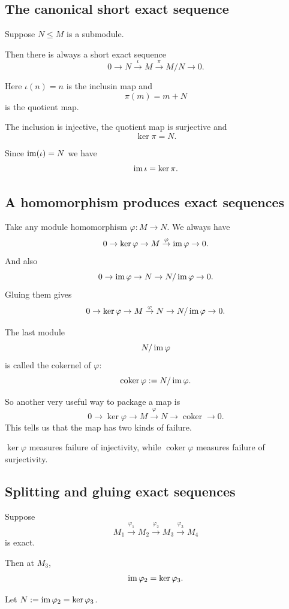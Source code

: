 \documentclass[11pt]{article}
\begin{document}
\subsection{The canonical short exact sequence}

Suppose $N \leq M$ is a submodule. 

Then there is always a short exact sequence 
\[
    0 \to N \overset{\iota}{\to} M 
    \overset{\pi}{\to} M/N \to 0. 
\]

Here $\iota(n) = n$ 
is the inclusin map and 
\[
    \pi(m) = m+N
\]
is the quotient map. 

The inclusion is injective, the quotient map 
is surjective and 
\[
    \ker \pi = N. 
\]

Since $\operatorname{im}(\iota) = N$ we have 
\[
    \operatorname{im} \iota = \ker \pi. 
\]

\subsection{A homomorphism produces 
exact sequences}

Take any module homomorphism $\varphi : M \to N$. 
We always have 
\[
    0 \to \ker \varphi \to M \overset{\varphi}{\to} 
    \operatorname{im} \varphi \to 0. 
\]
And also 
\[
    0 \to \operatorname{im} \varphi \to N \to N/\operatorname{im} \varphi \to 0. 
\]
Gluing them gives 
\[
    0 \to \ker \varphi \to M \overset{\varphi}{\to}
    N \to N/\operatorname{im}\varphi \to 0. 
\]

The last module 
\[
    N/\operatorname{im} \varphi
\]
is called the cokernel of $\varphi$: 
\[
    \operatorname{coker} \varphi := N/\operatorname{im} \varphi. 
\]

So another very useful way to package a map is 
\[
    0 \to \ker \varphi \to 
    M \overset{\varphi}{\to} N \to \operatorname{coker} 
    \to 0. 
\]
This tells us that the map has two kinds of failure. 

$\ker \varphi$ measures failure of injectivity, while 
$\operatorname{coker}\varphi$ measures failure of surjectivity.

\subsection{Splitting and gluing exact sequences}


Suppose 
\[
    M_1 \overset{\varphi_1}\to M_2 
    \overset{\varphi_2}\to M_3 
    \overset{\varphi_3}\to M_4
\]
is exact. 

Then at $M_3$, 
\[
    \operatorname{im} \varphi_2 = \ker \varphi_3.
\] 

Let $N := \operatorname{im} \varphi_2 = \ker \varphi_3$. 
\end{document}
